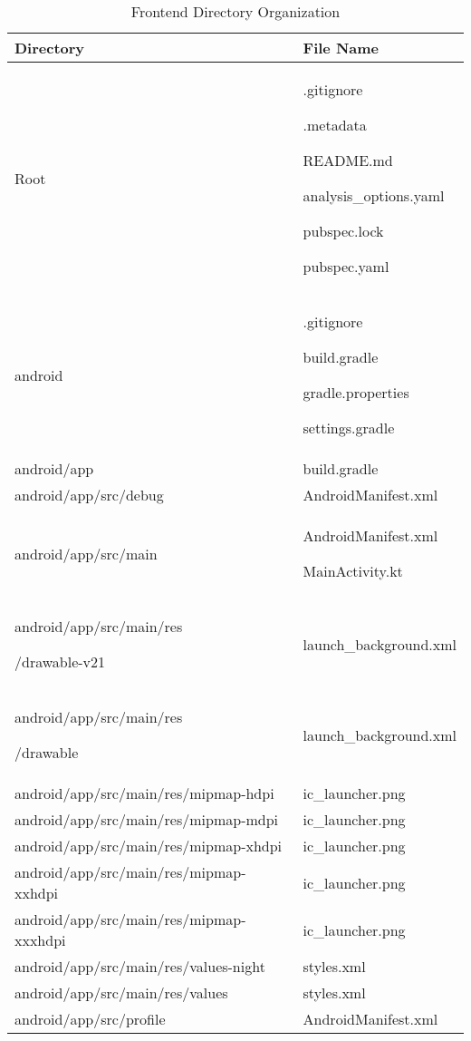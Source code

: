 \documentclass[conference]{IEEEtran}
\begin{document}
\begin{table}[h!]
\caption{Frontend Directory Organization}
\def\arraystretch{1.4} \small
\begin{tabular}{|p{4.1cm}|p{4.1cm}|}
    \hline
    Directory & File Name \\ \hline
    Root & .gitignore \par .metadata \par README.md \par analysis\_options.yaml \par pubspec.lock \par pubspec.yaml\\ \hline
    android & .gitignore \par build.gradle \par gradle.properties \par settings.gradle \\ \hline
    android/app & build.gradle \\ \hline
    android/app/src/debug & AndroidManifest.xml \\ \hline
    android/app/src/main & AndroidManifest.xml \par MainActivity.kt \\ \hline
    android/app/src/main/res \par /drawable-v21 & launch\_background.xml \\ \hline
    android/app/src/main/res \par /drawable & launch\_background.xml \\ \hline
    android/app/src/main/res/mipmap-hdpi & ic\_launcher.png \\ \hline
    android/app/src/main/res/mipmap-mdpi & ic\_launcher.png \\ \hline
    android/app/src/main/res/mipmap-xhdpi & ic\_launcher.png \\ \hline
    android/app/src/main/res/mipmap-xxhdpi & ic\_launcher.png \\ \hline
    android/app/src/main/res/mipmap-xxxhdpi & ic\_launcher.png \\ \hline
    android/app/src/main/res/values-night & styles.xml \\ \hline
    android/app/src/main/res/values & styles.xml \\ \hline
    android/app/src/profile & AndroidManifest.xml \\ \hline

\end{tabular}
\end{table}
\end{document}
